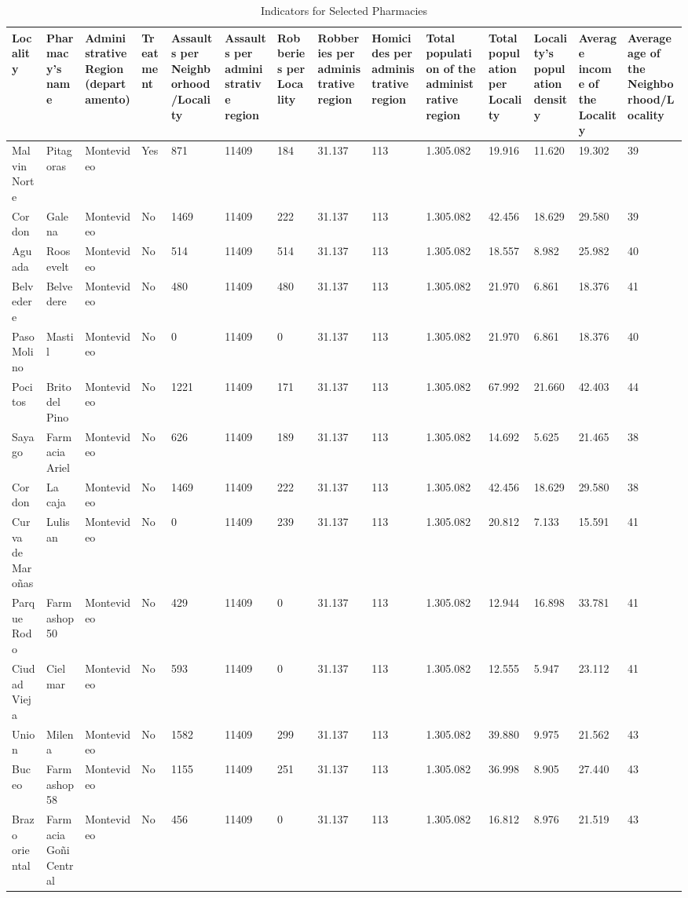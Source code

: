 \documentclass[11pt]{article}
\begin{document}
\newpage
{}
\begin{landscape}
  \tiny
    \begin{longtable}[htbp]{@{}p{1.2cm}p{1cm}p{1.5cm}p{1cm}p{1cm}p{1cm}p{1cm}p{1cm}p{1cm}p{1cm}p{1cm}p{1.2cm}p{1cm}p{1cm}@{}}
    \caption{Indicators for Selected  Pharmacies}\label{tab:phlongtable}  \tabularnewline
    \toprule
Locality & Pharmacy's name  & Administrative Region (departamento) & Treatment & Assaults per Neighborhood/Locality & Assaults per administrative region & Robberies per Locality & Robberies per administrative region & Homicides per administrative region & Total population of the administrative region & Total population per Locality & Locality's population density &
Average income of the Locality 	&Average age of the Neighborhood/Locality  \tabularnewline
\endhead
Malvin Norte	&	Pitagoras	&	Montevideo	&	Yes	&	871	&	11409	&	184	&	31.137	&	113	&	1.305.082	&	19.916	&	11.620	&	19.302	&	39  \tabularnewline
Cordon	&	Galena	&	Montevideo	&	No	&	1469	&	11409	&	222	&	31.137	&	113	&	1.305.082	&	42.456	&	18.629	&	29.580	&	39	\tabularnewline
Aguada	&	Roosevelt	&	Montevideo	&	No	&	514	&	11409	&	514	&	31.137	&	113	&	1.305.082	&	18.557	&	8.982	&	25.982	&	40	\tabularnewline
Belvedere	&	Belvedere	&	Montevideo	&	No	&	480	&	11409	&	480	&	31.137	&	113	&	1.305.082	&	21.970	&	6.861	&	18.376	&	41	\tabularnewline
Paso Molino	&	Mastil	&	Montevideo	&	No	&	0	&	11409	&	0	&	31.137	&	113	&	1.305.082	&	21.970	&	6.861	&	18.376	&	40	\tabularnewline
Pocitos	&	Brito del Pino	&	Montevideo	&	No	&	1221	&	11409	&	171	&	31.137	&	113	&	1.305.082	&	67.992	&	21.660	&	42.403	&	44	\tabularnewline
Sayago	&	Farmacia Ariel	&	Montevideo	&	No	&	626	&	11409	&	189	&	31.137	&	113	&	1.305.082	&	14.692	&	5.625	&	21.465	&	38	\tabularnewline
Cordon	&	La caja	&	Montevideo	&	No	&	1469	&	11409	&	222	&	31.137	&	113	&	1.305.082	&	42.456	&	18.629	&	29.580	&	38	\tabularnewline
Curva de Maroñas	&	Lulisan	&	Montevideo	&	No	&	0	&	11409	&	239	&	31.137	&	113	&	1.305.082	&	20.812	&	7.133	&	15.591	&	41	\tabularnewline
Parque Rodo	&	Farmashop 50	&	Montevideo	&	No	&	429	&	11409	&	0	&	31.137	&	113	&	1.305.082	&	12.944	&	16.898	&	33.781	&	41	\tabularnewline
Ciudad Vieja	&	Cielmar	&	Montevideo	&	No	&	593	&	11409	&	0	&	31.137	&	113	&	1.305.082	&	12.555	&	5.947	&	23.112	&	41	\tabularnewline
Union	&	Milena	&	Montevideo	&	No	&	1582	&	11409	&	299	&	31.137	&	113	&	1.305.082	&	39.880	&	9.975	&	21.562	&	43	\tabularnewline
Buceo	&	Farmashop 58	&	Montevideo	&	No	&	1155	&	11409	&	251	&	31.137	&	113	&	1.305.082	&	36.998	&	8.905	&	27.440	&	43	\tabularnewline
Brazo oriental	&	Farmacia Goñi Central	&	Montevideo	&	No	&	456	&	11409	&	0	&	31.137	&	113	&	1.305.082	&	16.812	&	8.976	&	21.519	&	43	\tabularnewline

\end{longtable}
\end{landscape}
\end{document}
